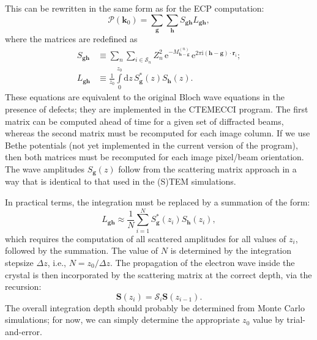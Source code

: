 \documentclass[DIV=calc, paper=letter, fontsize=11pt]{scrartcl}	 %
\begin{document}
This can be rewritten in the same form as for the ECP computation:
\begin{equation}
	\mathcal{P}(\mathbf{k}_0) = \sum_{\mathbf{g}}\sum_{\mathbf{h}} S_{\mathbf{g}\mathbf{h}} L_{\mathbf{g}\mathbf{h}},
    \label{eq:prob2}
\end{equation}
where the matrices are redefined as
\begin{subequations}
\begin{align}
    S_{\mathbf{g}\mathbf{h}} &\equiv \sum_{n}\sum_{i\in\mathcal{S}_n} Z^2_n\,\mathrm{e}^{-M^{(n)}_{\mathbf{h}-\mathbf{g}}}\,\mathrm{e}^{2\pi\mathrm{i} 
    (\mathbf{h}-\mathbf{g})\cdot\mathbf{r}_{i}};\label{eq:defnewa}\\
    L_{\mathbf{g}\mathbf{h}} &\equiv \frac{1}{z_{0}}\int\limits_{0}^{z_{0}} \mathrm{d}z\,  S^{\ast}_{\mathbf{g}}(z) S_{\mathbf{h}}(z).\label{eq:defnewb}
\end{align}
\end{subequations}
These equations are equivalent to the original Bloch wave equations in the presence of defects; they are implemented in the \textsf{CTEMECCI} program.
The first matrix can be computed ahead of time for a given set of diffracted beams, whereas the second matrix must be recomputed for each image column.
If we use Bethe potentials (not yet implemented in the current version of the program), then both matrices must be recomputed for each image pixel/beam
orientation. The wave amplitudes $S_{\mathbf{g}}(z)$ follow from the scattering matrix approach in a way that is identical to that used in the (S)TEM simulations.

In practical terms, the integration must be replaced by a summation of the form:
\begin{equation}
	L_{\mathbf{g}\mathbf{h}} \approx \frac{1}{N}\sum\limits_{i=1}^{N} S^{\ast}_{\mathbf{g}}(z_i) S_{\mathbf{h}}(z_i),
\end{equation}
which requires the computation of all scattered amplitudes for all values of $z_i$, followed by the summation.  The value of 
$N$ is determined by the integration stepsize $\Delta z$, i.e., $N=z_0/\Delta z$.  The propagation of the electron wave
inside the crystal is then incorporated by the scattering matrix at the correct depth, via the recursion:
\[
	\mathbf{S}(z_i) = \mathcal{S}_i\mathbf{S}(z_{i-1}).
\]
The overall integration depth should probably be determined from Monte Carlo simulations; for now, we can simply determine the appropriate 
$z_0$ value by trial-and-error.
\end{document}
